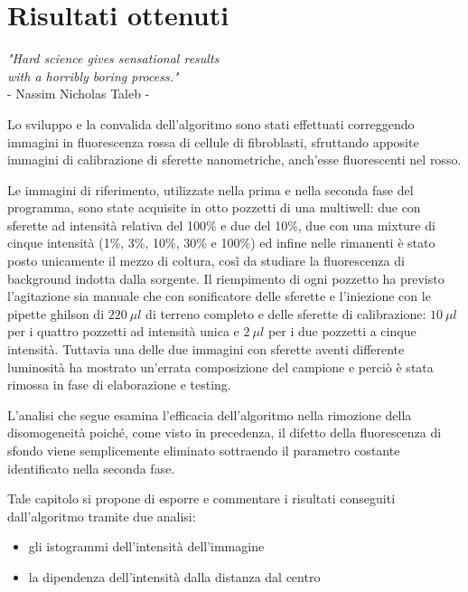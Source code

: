 \clearpage{\pagestyle{empty}\cleardoublepage}

\chapter{Risultati ottenuti}

\begin{flushright}\begin{small}\textit{"Hard science gives sensational results\\ with a horribly boring process."}\\
- Nassim Nicholas Taleb -\\
\end{small}\end{flushright}

Lo sviluppo e la convalida dell'algoritmo sono stati effettuati correggendo immagini in fluorescenza rossa di cellule di fibroblasti, sfruttando apposite immagini di calibrazione di sferette nanometriche, anch'esse fluorescenti nel rosso.

Le immagini di riferimento, utilizzate nella prima e nella seconda fase del programma, sono state acquisite in otto pozzetti di una multiwell: due con sferette ad intensità relativa del 100\% e due del 10\%, due con una mixture di cinque intensità (1\%, 3\%, 10\%, 30\% e 100\%) ed infine nelle rimanenti è stato posto unicamente il mezzo di coltura, così da studiare la fluorescenza di background indotta dalla sorgente.
Il riempimento di ogni pozzetto ha previsto l'agitazione sia manuale che con sonificatore delle sferette e l'iniezione con le pipette ghilson di $220\ \mu l$ di terreno completo e delle sferette di calibrazione: $10\ \mu l$ per i quattro pozzetti ad intensità unica e $2\ \mu l$ per i due pozzetti a cinque intensità.
Tuttavia una delle due immagini con sferette aventi differente luminosità ha mostrato un'errata composizione del campione e perciò è stata rimossa in fase di elaborazione e testing.

L'analisi che segue esamina l'efficacia dell'algoritmo nella rimozione della disomogeneità poiché, come visto in precedenza, il difetto della fluorescenza di sfondo viene semplicemente eliminato sottraendo il parametro costante identificato nella seconda fase.

Tale capitolo si propone di esporre e commentare i risultati conseguiti dall'algoritmo tramite due analisi: 
\begin{itemize}
 \item gli istogrammi dell'intensità dell'immagine
 \item la dipendenza dell'intensità dalla distanza dal centro
\end{itemize}

